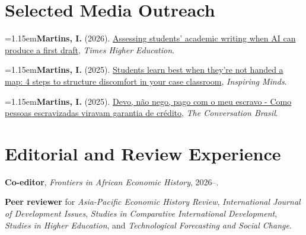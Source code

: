 \documentclass[11pt,a4paper]{article}
\newcommand{\cvlistitem}[1]{\par\addvspace{5pt}\noindent
  \textcolor{accent}{\raisebox{.45ex}{\rule{3.2pt}{3.2pt}}}\hspace{7pt}%
  \begin{minipage}[t]{\dimexpr\linewidth-12pt\relax}\hangindent=1.15em\hangafter=1\relax #1\par\end{minipage}\par}
\let\originalsection\section
\renewcommand{\section}[1]{\par\Needspace{110pt}\originalsection{#1}}
\begin{document}
\section{Selected Media Outreach}
\cvlistitem{\textbf{Martins, I.} (2026). \href{https://www.timeshighereducation.com/campus/assessing-students-academic-writing-when-ai-can-produce-first-draft}{Assessing students' academic writing when AI can produce a first draft}, \textit{Times Higher Education}.}
\smallskip
\cvlistitem{\textbf{Martins, I.} (2025). \href{https://hbsp.harvard.edu/inspiring-minds/students-learn-through-discomfort}{Students learn best when they're not handed a map: 4 steps to structure discomfort in your case classroom}, \textit{Inspiring Minds}.}
\smallskip
\cvlistitem{\textbf{Martins, I.} (2025). \href{https://theconversation.com/devo-nao-nego-pago-com-o-meu-escravo-como-pessoas-escravizadas-viravam-garantia-de-credito-272231}{Devo, não nego, pago com o meu escravo - Como pessoas escravizadas viravam garantia de crédito}, \textit{The Conversation Brasil}.}
\par{}


\section{Editorial and Review Experience}
{\small \textbf{Co-editor}, \textit{Frontiers in African Economic History}, 2026--.\par
\smallskip
\textbf{Peer reviewer} for \textit{Asia-Pacific Economic History Review}, \textit{International Journal of Development Issues}, \textit{Studies in Comparative International Development}, \textit{Studies in Higher Education}, and \textit{Technological Forecasting and Social Change}.\par}
\end{document}
